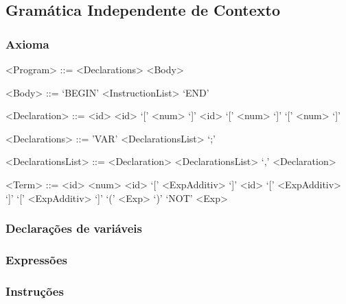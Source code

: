 \subsection{Gramática Independente de Contexto}
\label{subsec:gramatica:desenho}

\subsubsection{Axioma}
\label{subsec:subsubsec:axioma:desenho}

\begin{grammar}

<Program> ::= <Declarations> <Body>

<Body> ::= `BEGIN' <InstructionList> `END'

<Declaration> ::= <id>
\alt <id> `[' <num> `]'
\alt <id> `[' <num> `]' `[' <num> `]'

<Declarations> ::= 'VAR' <DeclarationsList> `;' 

<DeclarationsList> ::= <Declaration> 
\alt <DeclarationsList> `,' <Declaration> 

<Term> ::= <id>
\alt <num>
\alt <id> `[' <ExpAdditiv> `]'
\alt <id> `[' <ExpAdditiv> `]' `[' <ExpAdditiv> `]'
\alt `(' <Exp> `)'
\alt `NOT' <Exp>

\end{grammar}


\subsubsection{Declarações de variáveis}
\label{subsec:subsubsec:declaracoes:desenho}


\subsubsection{Expressões}
\label{subsec:subsubsec:expressoes:desenho}


\subsubsection{Instruções}
\label{subsec:subsubsec:instrucoes:desenho}



